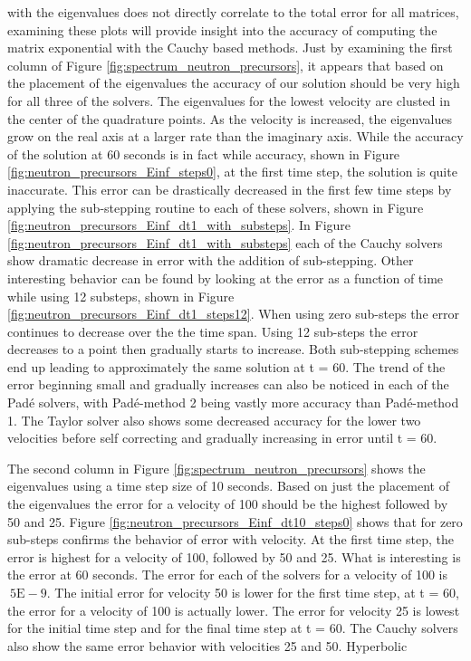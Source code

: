 \noindent with the eigenvalues does not directly correlate to the total error for all matrices, examining these plots will provide insight into the accuracy of computing the matrix exponential with the Cauchy based methods. Just by examining the first column of Figure \ref{fig:spectrum_neutron_precursors}, it appears that based on the placement of the eigenvalues the accuracy of our solution should be very high for all three of the solvers. The eigenvalues for the lowest velocity are clusted in the center of the quadrature points. As the velocity is increased, the eigenvalues grow on the real axis at a larger rate than the imaginary axis. While the accuracy of the solution at 60 seconds is in fact while accuracy, shown in Figure \ref{fig:neutron_precursors_Einf_steps0}, at the first time step, the solution is quite inaccurate. This error can be drastically decreased in the first few time steps by applying the sub-stepping routine to each of these solvers, shown in Figure \ref{fig:neutron_precursors_Einf_dt1_with_substeps}. In Figure \ref{fig:neutron_precursors_Einf_dt1_with_substeps} each of the Cauchy solvers show dramatic decrease in error with the addition of sub-stepping. Other interesting behavior can be found by looking at the error as a function of time while using 12 substeps, shown in Figure \ref{fig:neutron_precursors_Einf_dt1_steps12}. When using zero sub-steps the error continues to decrease over the the time span. Using 12 sub-steps the error decreases to a point then gradually starts to increase. Both sub-stepping schemes end up leading to approximately the same solution at t = 60. The trend of the error beginning small and gradually increases can also be noticed in each of the Pad\'e solvers, with Pad\'e-method 2 being vastly more accuracy than Pad\'e-method 1. The Taylor solver also shows some decreased accuracy for the lower two velocities before self correcting and gradually increasing in error until t = 60. 

The second column in Figure \ref{fig:spectrum_neutron_precursors} shows the eigenvalues using a time step size of 10 seconds. Based on just the placement of the eigenvalues the error for a velocity of 100 should be the highest followed by 50 and 25. Figure \ref{fig:neutron_precursors_Einf_dt10_steps0} shows that for zero sub-steps confirms the behavior of error with velocity. At the first time step, the error is highest for a velocity of 100, followed by 50 and 25. What is interesting is the error at 60 seconds. The error for each of the solvers for a velocity of 100 is $~5\text{E}-9$. The initial error for velocity 50 is lower for the first time step, at t = 60, the error for a velocity of 100 is actually lower. The error for velocity 25 is lowest for the initial time step and for the final time step at t = 60. The Cauchy solvers also show the same error behavior with velocities 25 and 50. Hyperbolic 

